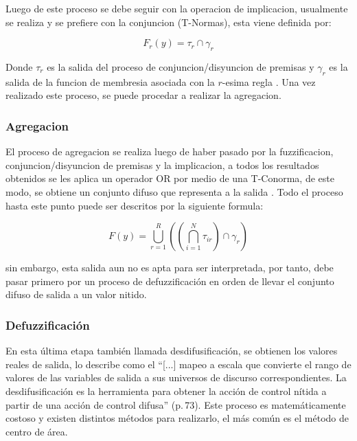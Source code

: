             Luego de este proceso se debe seguir con la operacion de implicacion, usualmente se realiza y se prefiere con la conjuncion (T-Normas), esta viene definida por:

            \begin{equation}\label{eq:implicacion}
                F_r(y) = \tau_r \cap \gamma_r
            \end{equation}

            Donde $\tau_r$ es la salida del proceso de conjuncion/disyuncion de premisas y $\gamma_r$ es la salida de la funcion de membresia asociada con la $r$-esima regla \Parencite{riid2003transparent}. Una vez realizado este proceso, se puede procedar a realizar la agregacion.
        
        \subsubsection{Agregacion}

            El proceso de agregacion se realiza luego de haber pasado por la fuzzificacion, conjuncion/disyuncion de premisas y la implicacion, a todos los resultados obtenidos se les aplica un operador OR por medio de una T-Conorma, de este modo, se obtiene un conjunto difuso que representa a la salida . Todo el proceso hasta este punto puede ser descritos por la siguiente formula:

            \begin{equation}\label{eq:implicacion}
                F(y) = \bigcup_{r=1}^{R}\left(\left(\bigcap_{i=1}^{N}\tau_{ir} \right) \cap \gamma_r\right)
            \end{equation}
            
            \noindent sin embargo, esta salida aun no es apta para ser interpretada, por tanto, debe pasar primero por un proceso de defuzzificación en orden de llevar el conjunto difuso de salida a un valor nitido.

        \subsubsection{Defuzzificación}

            En esta última etapa también llamada desdifusificación, se obtienen los valores reales de salida, \textcite{cruz2010inteligencia} lo describe como el \enquote{[...] mapeo a escala que convierte el rango de valores de las variables de salida a sus universos de discurso correspondientes. La desdifusificación es la herramienta para obtener la acción de control nítida a partir de una acción de control difusa} (p.$\,$73). Este proceso es matemáticamente costoso y existen distintos métodos para realizarlo, el más común es el método de centro de área.
            
